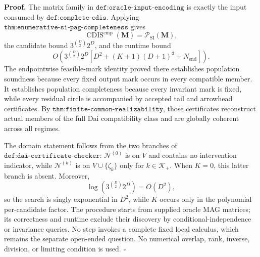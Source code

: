 \textbf{Proof.}
The matrix family in \(\texttt{def:oracle-input-encoding}\) is exactly the input consumed by \(\texttt{def:complete-cdis}\).  Applying \(\texttt{thm:enumerative-si-pag-completeness}\) gives
\[
\operatorname{CDIS}^{\mathrm{cmp}}(\mathbf M)
=\mathcal P_{\mathrm{SI}}(\mathbf M),
\]
the candidate bound \(3^{\binom D2}2^D\), and the runtime bound
\[
O\!\left(3^{\binom D2}2^D
\left[D^2+(K+1)(D+1)^3+N_{\mathrm{end}}\right]\right).
\]
The endpointwise feasible-mark identity proved there establishes population soundness because every fixed output mark occurs in every compatible member.  It establishes population completeness because every invariant mark is fixed, while every residual circle is accompanied by accepted tail and arrowhead certificates.  By \(\texttt{thm:finite-common-realizability}\), those certificates reconstruct actual members of the full Dai compatibility class and are globally coherent across all regimes.

The domain statement follows from the two branches of \(\texttt{def:dai-certificate-checker}\): \(\mathcal N^{(0)}\) is on \(V\) and contains no intervention indicator, while \(\mathcal N^{(k)}\) is on \(V\cup\{\zeta_k\}\) only for \(k\in\mathcal K_+\).  When \(K=0\), this latter branch is absent.  Moreover,
\[
\log\!\left(3^{\binom D2}2^D\right)=O(D^2),
\]
so the search is singly exponential in \(D^2\), while \(K\) occurs only in the polynomial per-candidate factor.  The procedure starts from supplied oracle MAG matrices; its correctness and runtime exclude their discovery by conditional-independence or invariance queries.  No step invokes a complete fixed local calculus, which remains the separate open-ended question.  No numerical overlap, rank, inverse, division, or limiting condition is used. \(\square\)